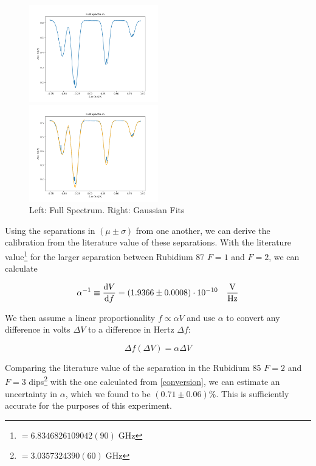 \documentclass[12pt, a4paper]{article}
\begin{document}
\begin{figure} [h]
    \centering
    \parbox{0.45\textwidth}{
        \includegraphics[width=0.5\textwidth]{fullspectrum.png}
    }
    \hfill
    \parbox{0.45\textwidth}{
        \includegraphics[width=0.5\textwidth]{fullspectrumgaussian}    
    }
    \caption{Left: Full Spectrum. Right: Gaussian Fits}
\end{figure}

Using the separations in $(\mu \pm \sigma)$ from one another, we can derive the calibration from the literature value of these separations. With the literature value\footnote{$= 6.8346826109042(90)\;\si{\giga\hertz}$\cite{script}} for the larger separation between Rubidium 87 $F = 1$ and $F = 2$, we can calculate

\begin{equation}
\alpha^{-1} \equiv \dv{V}{f} = (1.9366 \pm 0.0008) \cdot 10^{-10} \quad \si{\frac{\volt}{\hertz}}
\end{equation}

We then assume a linear proportionality $f \propto \alpha V$ and use $\alpha$ to convert any difference in volts $\Delta V$ to a difference in Hertz $\Delta f$:

\begin{equation}
\Delta f (\Delta V) = \alpha \Delta V
\label{conversion}
\end{equation}

Comparing the literature value of the separation in the Rubidium 85 $F = 2$ and $F = 3$ dips\footnote{$=3.0357324390(60) \;\si{\giga\hertz}$\cite{script}} with the one calculated from \autoref{conversion}, we can estimate an uncertainty in $\alpha$, which we found to be $(0.71 \pm 0.06) \%$. This is sufficiently accurate for the purposes of this experiment.
\end{document}
